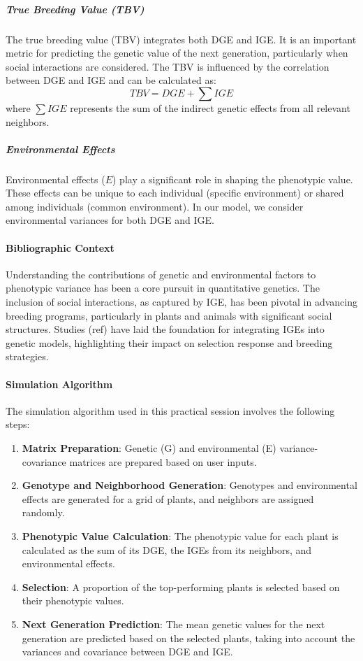 \documentclass[
]{article}
\providecommand{\tightlist}{%
  \setlength{\itemsep}{0pt}\setlength{\parskip}{0pt}}
\begin{document}
\subparagraph{True Breeding Value (TBV)}\label{true-breeding-value-tbv}

The true breeding value (TBV) integrates both DGE and IGE. It is an
important metric for predicting the genetic value of the next
generation, particularly when social interactions are considered. The
TBV is influenced by the correlation between DGE and IGE and can be
calculated as: \[ TBV = DGE + \sum IGE \] where \(\sum IGE\) represents
the sum of the indirect genetic effects from all relevant neighbors.

\subparagraph{Environmental Effects}\label{environmental-effects}

Environmental effects (\(E\)) play a significant role in shaping the
phenotypic value. These effects can be unique to each individual
(specific environment) or shared among individuals (common environment).
In our model, we consider environmental variances for both DGE and IGE.

\paragraph{Bibliographic Context}\label{bibliographic-context}

Understanding the contributions of genetic and environmental factors to
phenotypic variance has been a core pursuit in quantitative genetics.
The inclusion of social interactions, as captured by IGE, has been
pivotal in advancing breeding programs, particularly in plants and
animals with significant social structures. Studies (ref) have laid the
foundation for integrating IGEs into genetic models, highlighting their
impact on selection response and breeding strategies.

\paragraph{Simulation Algorithm}\label{simulation-algorithm}

The simulation algorithm used in this practical session involves the
following steps:

\begin{enumerate}
\def\labelenumi{\arabic{enumi}.}
\tightlist
\item
  \textbf{Matrix Preparation}: Genetic (G) and environmental (E)
  variance-covariance matrices are prepared based on user inputs.
\item
  \textbf{Genotype and Neighborhood Generation}: Genotypes and
  environmental effects are generated for a grid of plants, and
  neighbors are assigned randomly.
\item
  \textbf{Phenotypic Value Calculation}: The phenotypic value for each
  plant is calculated as the sum of its DGE, the IGEs from its
  neighbors, and environmental effects.
\item
  \textbf{Selection}: A proportion of the top-performing plants is
  selected based on their phenotypic values.
\item
  \textbf{Next Generation Prediction}: The mean genetic values for the
  next generation are predicted based on the selected plants, taking
  into account the variances and covariance between DGE and IGE.
\end{enumerate}
\end{document}
